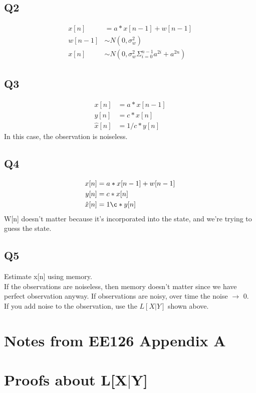 \documentclass[leqno,twocolumn]{article}
\begin{document}
\subsection{Q2}
\begin{align*}
x[n] &= a*x[n-1] + w[n-1]\\
w[n-1] &\sim N(0,\sigma_w^2)\\
x[n] &\sim N(0, \sigma_w^2\Sigma_{i=0}^{n-1}a^{2i} + a^{2n})
\end{align*}

\subsection{Q3}
\begin{align*}
x[n] &= a*x[n-1]\\
y[n] &= c*x[n]\\
\hat{x}[n] &= 1/c*y[n]
\end{align*}
In this case, the observation is noiseless.

\subsection{Q4}
\begin{align*}
x[n] &= a*x[n-1]+w[n-1]\\
y[n] &= c*x[n]\\
\hat{x}[n] &= 1\c*y[n]
\end{align*}
W[n] doesn't matter because it's incorporated into the state, and we're trying to guess the state.

\subsection{Q5}
Estimate x[n] using memory.\\
If the observations are noiseless, then memory doesn't matter since we have perfect observation anyway. If observations are noisy, over time the noise $\rightarrow$ 0.\\

If you add noise to the observation, use the $L[X|Y]$ shown above.

\section{Notes from EE126 Appendix A}

\section{Proofs about L[X$|$Y]}
\end{document}

